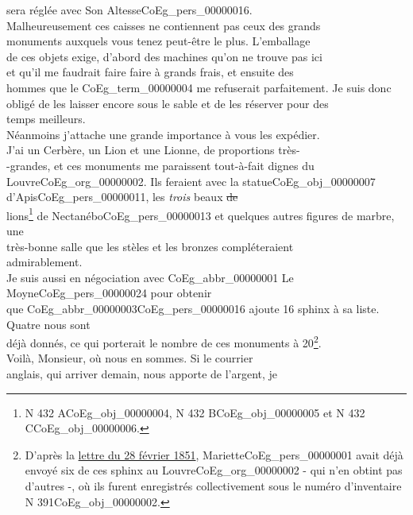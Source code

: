 \documentclass{book}
\begin{document}
sera réglée avec Son Altesse\gls{CoEg_pers_00000016}.\\
\indent Malheureusement ces caisses ne contiennent pas ceux des grands\\
monuments auxquels vous tenez peut-être le plus. L’emballage\\
de ces objets exige, d’abord des machines qu’on ne trouve pas ici\\
et qu’il me faudrait faire faire à grands frais, et ensuite des\\
hommes que le \Gls{CoEg_term_00000004} me refuserait parfaitement. Je suis donc\\
obligé de les laisser encore sous le sable et de les réserver pour des\\
temps meilleurs.\\
\indent Néanmoins j’attache une grande importance à vous les expédier.\\
J’ai un Cerbère, un Lion et une Lionne, de proportions très-\\
-grandes, et ces monuments me paraissent tout-à-fait dignes du\\
Louvre\gls{CoEg_org_00000002}. Ils feraient avec la statue\gls{CoEg_obj_00000007} d’Apis\gls{CoEg_pers_00000011}, les \textit{trois} beaux \sout{de}\\
lions\footnote{N 432 A\gls{CoEg_obj_00000004}, N 432 B\gls{CoEg_obj_00000005} et N 432 C\gls{CoEg_obj_00000006}.} de Nectanébo\gls{CoEg_pers_00000013} et quelques autres figures de marbre, une\\
très-bonne salle que les stèles et les bronzes compléteraient\\
admirablement.\\
\indent Je suis aussi en négociation avec \gls{CoEg_abbr_00000001} Le Moyne\gls{CoEg_pers_00000024} pour obtenir\\
que \gls{CoEg_abbr_00000003}\gls{CoEg_pers_00000016} ajoute 16 sphinx à sa liste. Quatre nous sont\\
déjà donnés, ce qui porterait le nombre de ces monuments à 20\footnote{D'après la  \hyperref[CoEg_Mariette_1851-02-28]{lettre du 28 février 1851}, Mariette\gls{CoEg_pers_00000001} avait déjà envoyé six de ces sphinx au Louvre\gls{CoEg_org_00000002} - qui n'en obtint pas d'autres -, où ils furent enregistrés collectivement sous le numéro d'inventaire N 391\gls{CoEg_obj_00000002}.}.\\
\indent Voilà, Monsieur, où nous en sommes. Si le courrier\\
anglais, qui arriver demain, nous apporte de l’argent, je\\
\end{document}
